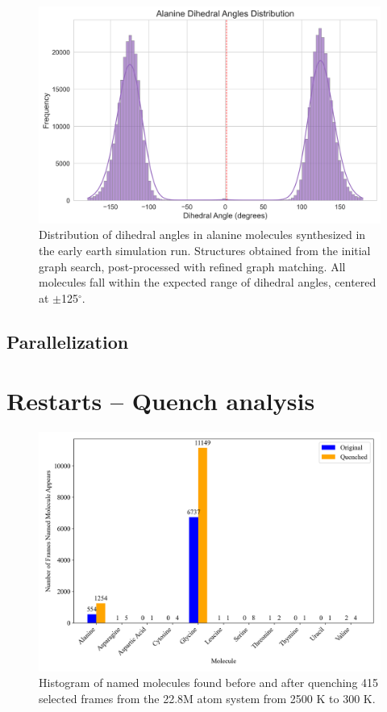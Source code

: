 \begin{figure}[!ht]
    \centering
    \includegraphics[width=1\linewidth]{Images/alanine_dihedral/dihedral_angles_distribution.png}
    \caption[Distribution of synthesized alanine dihedral angles]{Distribution of dihedral angles in alanine molecules synthesized in the early earth simulation run. Structures obtained from the initial graph search, post-processed with refined graph matching. All molecules fall within the expected range of dihedral angles, centered at $\pm$125$^\circ$.}
    \label{fig:ala_dihedral}
\end{figure}{}

\subsection{Parallelization}
\label{subsec:molfind_parallelization}

\section{Restarts -- Quench analysis}
\label{sec:restarts_quench_analysis}

\begin{figure}[!hp]
    \centering
    \includegraphics[width=1\linewidth]{Images/early_earth/hist-before-after-quench.png}
    \caption[Histogram: molecules found before and after quenching large early earth system]{Histogram of named molecules found before and after quenching 415 selected frames from the 22.8M atom system from 2500 K to 300 K.}
    \label{fig:ee_quench_hist}
\end{figure}

